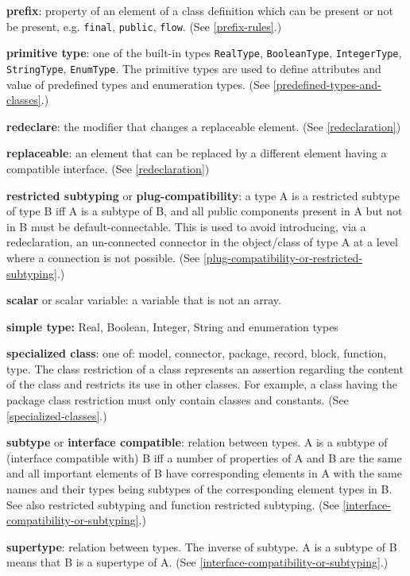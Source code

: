 \textbf{prefix}: property of an element of a class definition which can
be present or not be present, e.g. \lstinline!final!, \lstinline!public!, \lstinline!flow!. (See \autoref{prefix-rules}.)

\textbf{primitive type}: one of the built-in types \lstinline!RealType!,
\lstinline!BooleanType!, \lstinline!IntegerType!, \lstinline!StringType!, \lstinline!EnumType!. The primitive types are
used to define attributes and value of predefined types and enumeration
types. (See \autoref{predefined-types-and-classes}.)

\textbf{redeclare}: the modifier that changes a replaceable element.
(See \autoref{redeclaration})

\textbf{replaceable}: an element that can be replaced by a different
element having a compatible interface. (See \autoref{redeclaration})

\textbf{restricted subtyping} or \textbf{plug-compatibility}: a type A
is a restricted subtype of type B iff A is a subtype of B, and all
public components present in A but not in B must be default-connectable.
This is used to avoid introducing, via a redeclaration, an un-connected
connector in the object/class of type A at a level where a connection is
not possible. (See \autoref{plug-compatibility-or-restricted-subtyping}.)

\textbf{scalar} or scalar variable: a variable that is not an array.

\textbf{simple type:} Real, Boolean, Integer, String and enumeration
types

\textbf{specialized class}: one of: model, connector, package, record,
block, function, type. The class restriction of a class represents an
assertion regarding the content of the class and restricts its use in
other classes. For example, a class having the package class restriction
must only contain classes and constants. (See \autoref{specialized-classes}.)

\textbf{subtype} or \textbf{interface compatible}: relation between
types. A is a subtype of (interface compatible with) B iff a number of
properties of A and B are the same and all important elements of B have
corresponding elements in A with the same names and their types being
subtypes of the corresponding element types in B. See also restricted
subtyping and function restricted subtyping. (See \autoref{interface-compatibility-or-subtyping}.)

\textbf{supertype}: relation between types. The inverse of subtype. A is
a subtype of B means that B is a supertype of A. (See \autoref{interface-compatibility-or-subtyping}.)

